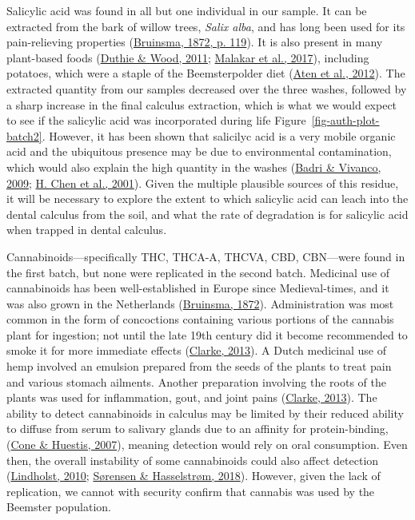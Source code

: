 \documentclass[
  letterpaper,
]{book}
\begin{document}
Salicylic acid was found in all but one individual in our sample. It can
be extracted from the bark of willow trees, \emph{Salix alba}, and has
long been used for its pain-relieving properties
(\protect\hyperlink{ref-bruinsmaBijdragenTot1872}{Bruinsma, 1872, p.
119}). It is also present in many plant-based foods
(\protect\hyperlink{ref-duthieNaturalSalicylates2011}{Duthie \& Wood,
2011}; \protect\hyperlink{ref-malakarNaturallyOccurring2017}{Malakar et
al., 2017}), including potatoes, which were a staple of the
Beemsterpolder diet (\protect\hyperlink{ref-aten400Jaar2012}{Aten et
al., 2012}). The extracted quantity from our samples decreased over the
three washes, followed by a sharp increase in the final calculus
extraction, which is what we would expect to see if the salicylic acid
was incorporated during life Figure~\ref{fig-auth-plot-batch2}. However,
it has been shown that salicilyc acid is a very mobile organic acid and
the ubiquitous presence may be due to environmental contamination, which
would also explain the high quantity in the washes
(\protect\hyperlink{ref-badriRegulationFunction2009}{Badri \& Vivanco,
2009}; \protect\hyperlink{ref-chenCa2Dependent2001}{H. Chen et al.,
2001}). Given the multiple plausible sources of this residue, it will be
necessary to explore the extent to which salicylic acid can leach into
the dental calculus from the soil, and what the rate of degradation is
for salicylic acid when trapped in dental calculus.

Cannabinoids---specifically THC, THCA-A, THCVA, CBD, CBN---were found in
the first batch, but none were replicated in the second batch. Medicinal
use of cannabinoids has been well-established in Europe since
Medieval-times, and it was also grown in the Netherlands
(\protect\hyperlink{ref-bruinsmaBijdragenTot1872}{Bruinsma, 1872}).
Administration was most common in the form of concoctions containing
various portions of the cannabis plant for ingestion; not until the late
19th century did it become recommended to smoke it for more immediate
effects (\protect\hyperlink{ref-clarkeCannabisEvolution2013}{Clarke,
2013}). A Dutch medicinal use of hemp involved an emulsion prepared from
the seeds of the plants to treat pain and various stomach ailments.
Another preparation involving the roots of the plants was used for
inflammation, gout, and joint pains
(\protect\hyperlink{ref-clarkeCannabisEvolution2013}{Clarke, 2013}). The
ability to detect cannabinoids in calculus may be limited by their
reduced ability to diffuse from serum to salivary glands due to an
affinity for protein-binding,
(\protect\hyperlink{ref-coneInterpretationOral2007}{Cone \& Huestis,
2007}), meaning detection would rely on oral consumption. Even then, the
overall instability of some cannabinoids could also affect detection
(\protect\hyperlink{ref-lindholstLongTerm2010}{Lindholst, 2010};
\protect\hyperlink{ref-sorensenEffectAntioxidants2018}{Sørensen \&
Hasselstrøm, 2018}). However, given the lack of replication, we cannot
with security confirm that cannabis was used by the Beemster population.
\end{document}
